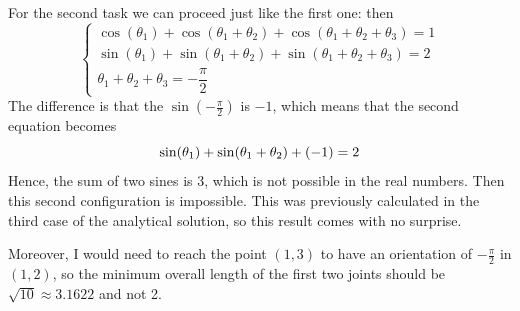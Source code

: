 For the second task we can proceed just like the first one: then 
$$\begin{cases}
    \cos(\theta_1) + \cos(\theta_1+\theta_2) + \cos(\theta_1+\theta_2+\theta_3) = 1 \\ 
    \sin(\theta_1) + \sin(\theta_1+\theta_2) + \sin(\theta_1+\theta_2+\theta_3) = 2\\ 
    \theta_1+\theta_2+\theta_3 = -\dfrac{\pi}{2}
\end{cases}$$
The difference is that the $\sin(-\frac\pi 2)$ is $-1$, which means that the second equation becomes
$$\sin(\theta_1) + \sin(\theta_1+\theta_2) + (-1) = 2\\ $$
Hence, the sum of two sines is 3, which is not possible in the real numbers. Then this second configuration is impossible. This was previously calculated in the third case of the analytical solution, so this result comes with no surprise. 


Moreover, I would need to reach the point $(1,3)$ to have an orientation of $-\frac\pi2$ in $(1,2)$, so the minimum overall length of the first two joints should be $\sqrt{10} \approx 3.1622$ and not 2.

